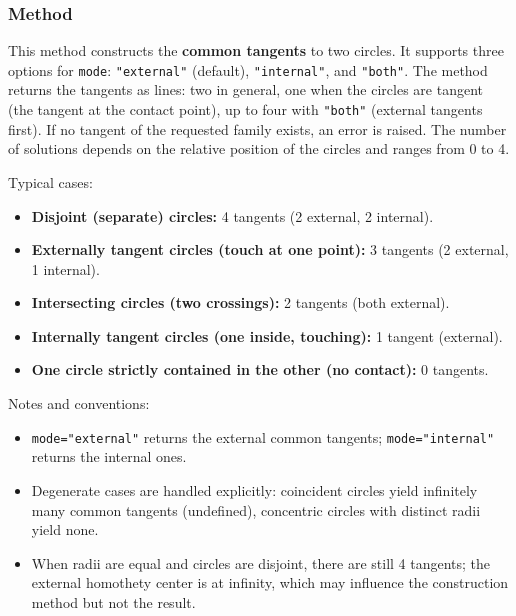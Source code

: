 \subsubsection{Method }
\label{ssub:common_tangent}

This method constructs the \textbf{common tangents} to two circles.
It supports three options for \verb|mode|:
\verb|"external"| (default), \verb|"internal"|, and \verb|"both"|.
The method returns the tangents as lines: two in general, one when the circles
are tangent (the tangent at the contact point), up to four with \verb|"both"|
(external tangents first). If no tangent of the requested family exists, an
error is raised.
The number of solutions depends on the relative position of the circles and ranges from 0 to 4.
\medskip

Typical cases:
\begin{itemize}
\small
\item \textbf{Disjoint (separate) circles:} 4 tangents (2 external, 2 internal).
\item \textbf{Externally tangent circles (touch at one point):} 3 tangents (2 external, 1 internal).
\item \textbf{Intersecting circles (two crossings):} 2 tangents (both external).
\item \textbf{Internally tangent circles (one inside, touching):} 1 tangent (external).
\item \textbf{One circle strictly contained in the other (no contact):} 0 tangents.
\end{itemize}

Notes and conventions:
\begin{itemize}
\item \verb|mode="external"| returns the external common tangents; \verb|mode="internal"| returns the internal ones.
\item Degenerate cases are handled explicitly: coincident circles yield infinitely many common tangents (undefined), concentric circles with distinct radii yield none.
\item When radii are equal and circles are disjoint, there are still 4 tangents; the external homothety center is at infinity, which may influence the construction method but not the result.
\end{itemize}

\medskip


\begin{tkzexample}[latex=.45\textwidth]
\begin{center}
\end{center}
\end{tkzexample}


